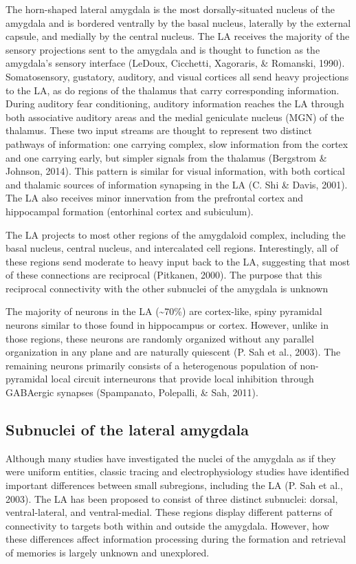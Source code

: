 \documentclass[12pt,a4paper,]{report}
\begin{document}
The horn-shaped lateral amygdala is the most dorsally-situated nucleus
of the amygdala and is bordered ventrally by the basal nucleus,
laterally by the external capsule, and medially by the central nucleus.
The LA receives the majority of the sensory projections sent to the
amygdala and is thought to function as the amygdala's sensory interface
(LeDoux, Cicchetti, Xagoraris, \& Romanski, 1990). Somatosensory,
gustatory, auditory, and visual cortices all send heavy projections to
the LA, as do regions of the thalamus that carry corresponding
information. During auditory fear conditioning, auditory information
reaches the LA through both associative auditory areas and the medial
geniculate nucleus (MGN) of the thalamus. These two input streams are
thought to represent two distinct pathways of information: one carrying
complex, slow information from the cortex and one carrying early, but
simpler signals from the thalamus (Bergstrom \& Johnson, 2014). This
pattern is similar for visual information, with both cortical and
thalamic sources of information synapsing in the LA (C. Shi \& Davis,
2001). The LA also receives minor innervation from the prefrontal cortex
and hippocampal formation (entorhinal cortex and subiculum).

The LA projects to most other regions of the amygdaloid complex,
including the basal nucleus, central nucleus, and intercalated cell
regions. Interestingly, all of these regions send moderate to heavy
input back to the LA, suggesting that most of these connections are
reciprocal (Pitkanen, 2000). The purpose that this reciprocal
connectivity with the other subnuclei of the amygdala is unknown

The majority of neurons in the LA (\textasciitilde{}70\%) are
cortex-like, spiny pyramidal neurons similar to those found in
hippocampus or cortex. However, unlike in those regions, these neurons
are randomly organized without any parallel organization in any plane
and are naturally quiescent (P. Sah et al., 2003). The remaining neurons
primarily consists of a heterogenous population of non-pyramidal local
circuit interneurons that provide local inhibition through GABAergic
synapses (Spampanato, Polepalli, \& Sah, 2011).

\subsection{Subnuclei of the lateral
amygdala}\label{subnuclei-of-the-lateral-amygdala}

Although many studies have investigated the nuclei of the amygdala as if
they were uniform entities, classic tracing and electrophysiology
studies have identified important differences between small subregions,
including the LA (P. Sah et al., 2003). The LA has been proposed to
consist of three distinct subnuclei: dorsal, ventral-lateral, and
ventral-medial. These regions display different patterns of connectivity
to targets both within and outside the amygdala. However, how these
differences affect information processing during the formation and
retrieval of memories is largely unknown and unexplored.
\end{document}
